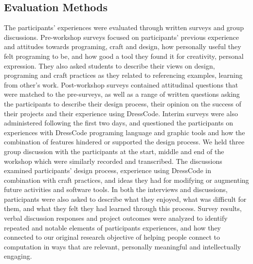 \documentclass{sigchi}
\begin{document}
\subsection{Evaluation Methods}
The participants' experiences were evaluated through written surveys and group discussions. Pre-workshop surveys focused on participants' previous experience and attitudes towards programing, craft and design, how personally useful they felt programing to be, and how good a tool they found it for creativity, personal expression. They also asked students to describe their views on design, programing and craft practices as they related to referencing examples, learning from other's work. Post-workshop surveys contained attitudinal questions that were matched to the pre-surveys, as well as a range of written questions asking the participants to describe their design process, their opinion on the success of their projects and their experience using DressCode. Interim surveys were also administered following the first two days, and questioned the participants on experiences with DressCode programing language and graphic tools and how the combination of features hindered or supported the design process. We held three group discussion with the participants at the start, middle and end of the workshop which were similarly recorded and transcribed. The discussions examined participants' design process, experience using DressCode in combination with craft practices, and ideas they had for modifying or augmenting future activities and software tools. In both the interviews and discussions, participants were also asked to describe what they enjoyed, what was difficult for them, and what they felt they had learned through this process. Survey results, verbal discussion responses and project outcomes were analyzed to identify repeated and notable elements of participants experiences, and how they connected to our original research objective of helping people connect to computation in ways that are relevant, personally meaningful and intellectually engaging.
\end{document}
